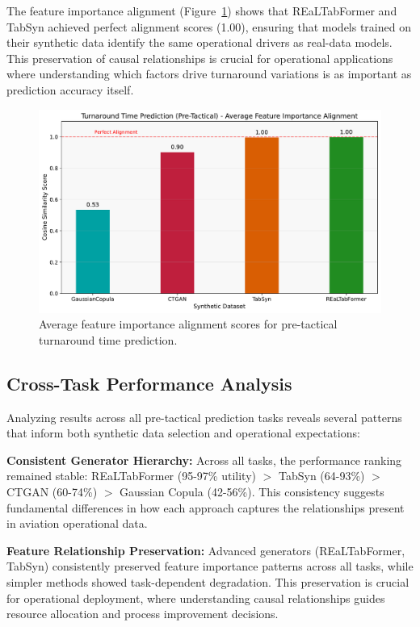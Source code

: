 \documentclass[conference]{IEEEtran}
\begin{document}
The feature importance alignment (Figure~\ref{fig:turnaround_pre_alignment}) shows that  REaLTabFormer and TabSyn achieved perfect alignment scores (1.00), ensuring that models trained on their synthetic data identify the same operational drivers as real-data models. This preservation of causal relationships is crucial for operational applications where understanding which factors drive turnaround variations is as important as prediction accuracy itself.

\begin{figure}[htbp]
    \centering
    \includegraphics[width=0.8\linewidth]{plots/turnaround_min_pre-tactical/turnaround_min_pre-tactical_avg_alignment_score.pdf}
    \caption{Average feature importance alignment scores for pre-tactical turnaround time prediction.}
    \label{fig:turnaround_pre_alignment}
\end{figure}

\subsection{Cross-Task Performance Analysis}

Analyzing results across all pre-tactical prediction tasks reveals several patterns that inform both synthetic data selection and operational expectations:

\textbf{Consistent Generator Hierarchy:} Across all tasks, the performance ranking remained stable: REaLTabFormer (95-97\% utility) $>$ TabSyn (64-93\%) $>$ CTGAN (60-74\%) $>$ Gaussian Copula (42-56\%). This consistency suggests fundamental differences in how each approach captures the relationships present in aviation operational data.


\textbf{Feature Relationship Preservation:} Advanced generators (REaLTabFormer, TabSyn) consistently preserved feature importance patterns across all tasks, while simpler methods showed task-dependent degradation. This preservation is crucial for operational deployment, where understanding causal relationships guides resource allocation and process improvement decisions.
\end{document}
